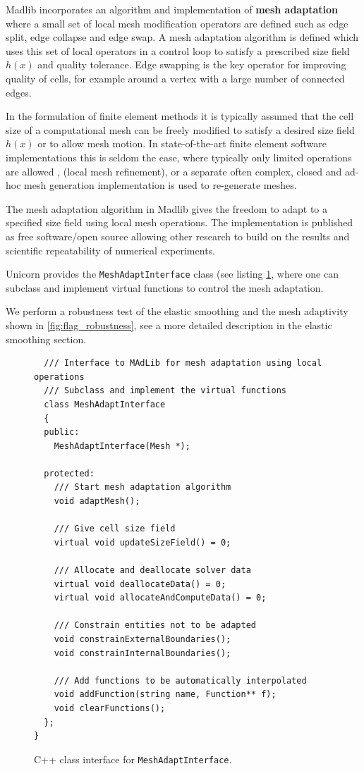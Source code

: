 Madlib incorporates an algorithm and implementation of {\bf mesh
adaptation} where a small set of local mesh modification operators are
defined such as edge split, edge collapse and edge swap. A mesh
adaptation algorithm is defined which uses this set of local operators
in a control loop to satisfy a prescribed size field $h(x)$ and
quality tolerance. Edge swapping is the key operator for improving
quality of cells, for example around a vertex with a large number of
connected edges.

In the formulation of finite element methods it is typically assumed
that the cell size of a computational mesh can be freely modified to
satisfy a desired size field $h(x)$ or to allow mesh motion. In
state-of-the-art finite element software implementations this is
seldom the case, where typically only limited operations are allowed
\cite{BangerthHartmannEtAl2007, COMSOL2009}, (local mesh refinement),
or a separate often complex, closed and ad-hoc mesh generation
implementation is used to re-generate meshes.

The mesh adaptation algorithm in Madlib gives the freedom to adapt to
a specified size field using local mesh operations. The implementation
is published as free software/open source allowing other research to
build on the results and scientific repeatability of numerical
experiments.

Unicorn provides the {\tt MeshAdaptInterface} class (see
listing \ref{code:MeshAdaptInterface}, where one can subclass and
implement virtual functions to control the mesh adaptation.

We perform a robustness test of the elastic smoothing and the mesh
adaptivity shown in \ref{fig:flag_robustness}, see a more detailed
description in the elastic smoothing section.


\begin{figure}[!h]
\begin{lstlisting}
  /// Interface to MAdLib for mesh adaptation using local operations
  /// Subclass and implement the virtual functions
  class MeshAdaptInterface
  {
  public:
    MeshAdaptInterface(Mesh *);
    
  protected:
    /// Start mesh adaptation algorithm
    void adaptMesh();

    /// Give cell size field
    virtual void updateSizeField() = 0;

    /// Allocate and deallocate solver data
    virtual void deallocateData() = 0;
    virtual void allocateAndComputeData() = 0;

    /// Constrain entities not to be adapted
    void constrainExternalBoundaries();
    void constrainInternalBoundaries();

    /// Add functions to be automatically interpolated
    void addFunction(string name, Function** f);
    void clearFunctions();
  };
}
\end{lstlisting}
\caption{
C++ class interface for {\tt MeshAdaptInterface}.
}
\label{code:MeshAdaptInterface}
\end{figure}



